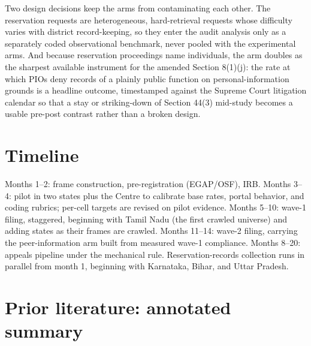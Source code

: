 \documentclass[11pt]{article}
\begin{document}
Two design decisions keep the arms from contaminating each other. The reservation requests are heterogeneous, hard-retrieval requests whose difficulty varies with district record-keeping, so they enter the audit analysis only as a separately coded observational benchmark, never pooled with the experimental arms. And because reservation proceedings name individuals, the arm doubles as the sharpest available instrument for the amended Section 8(1)(j): the rate at which PIOs deny records of a plainly public function on personal-information grounds is a headline outcome, timestamped against the Supreme Court litigation calendar so that a stay or striking-down of Section 44(3) mid-study becomes a usable pre-post contrast rather than a broken design.

\section{Timeline}
\label{sec:timeline}

Months 1--2: frame construction, pre-registration (EGAP/OSF), IRB. Months 3--4: pilot in two states plus the Centre to calibrate base rates, portal behavior, and coding rubrics; per-cell targets are revised on pilot evidence. Months 5--10: wave-1 filing, staggered, beginning with Tamil Nadu (the first crawled universe) and adding states as their frames are crawled. Months 11--14: wave-2 filing, carrying the peer-information arm built from measured wave-1 compliance. Months 8--20: appeals pipeline under the mechanical rule. Reservation-records collection runs in parallel from month 1, beginning with Karnataka, Bihar, and Uttar Pradesh.




\appendix
\clearpage
\renewcommand{\thesection}{SI~\Alph{section}}
\renewcommand{\thesubsection}{SI~\Alph{section}.\arabic{subsection}}
\renewcommand{\thetable}{SI\arabic{table}}
\setcounter{table}{0}

\section{Prior literature: annotated summary}
\label{app:lit}
\end{document}

